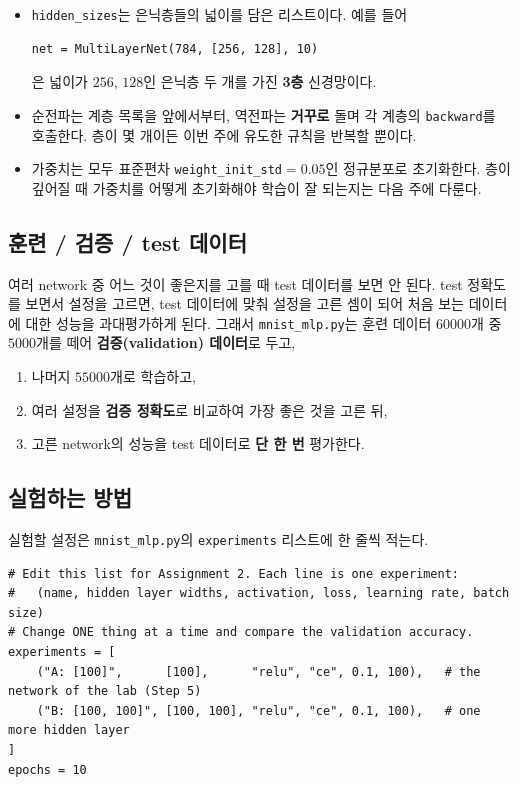 \documentclass[11pt,a4paper]{article}
\begin{document}
\begin{itemize}[leftmargin=1.8em]
\item \texttt{hidden\_sizes}는 은닉층들의 넓이를 담은 리스트이다. 예를 들어
\begin{lstlisting}
net = MultiLayerNet(784, [256, 128], 10)
\end{lstlisting}
은 넓이가 $256$, $128$인 은닉층 두 개를 가진 \textbf{3층} 신경망이다.
\item 순전파는 계층 목록을 앞에서부터, 역전파는 \textbf{거꾸로} 돌며 각 계층의 \texttt{backward}를 호출한다.
층이 몇 개이든 이번 주에 유도한 규칙을 반복할 뿐이다.
\item 가중치는 모두 표준편차 \texttt{weight\_init\_std}$=0.05$인 정규분포로 초기화한다.
층이 깊어질 때 가중치를 어떻게 초기화해야 학습이 잘 되는지는 다음 주에 다룬다.
\end{itemize}

\subsection*{훈련 / 검증 / test 데이터}

여러 network 중 어느 것이 좋은지를 고를 때 test 데이터를 보면 안 된다.
test 정확도를 보면서 설정을 고르면, test 데이터에 맞춰 설정을 고른 셈이 되어
처음 보는 데이터에 대한 성능을 과대평가하게 된다.
그래서 \texttt{mnist\_mlp.py}는 훈련 데이터 $60000$개 중 $5000$개를 떼어 \textbf{검증(validation) 데이터}로 두고,
\begin{enumerate}[leftmargin=1.8em]
\item 나머지 $55000$개로 학습하고,
\item 여러 설정을 \textbf{검증 정확도}로 비교하여 가장 좋은 것을 고른 뒤,
\item 고른 network의 성능을 test 데이터로 \textbf{단 한 번} 평가한다.
\end{enumerate}

\subsection*{실험하는 방법}

실험할 설정은 \texttt{mnist\_mlp.py}의 \texttt{experiments} 리스트에 한 줄씩 적는다.

\begin{lstlisting}
# Edit this list for Assignment 2. Each line is one experiment:
#   (name, hidden layer widths, activation, loss, learning rate, batch size)
# Change ONE thing at a time and compare the validation accuracy.
experiments = [
    ("A: [100]",      [100],      "relu", "ce", 0.1, 100),   # the network of the lab (Step 5)
    ("B: [100, 100]", [100, 100], "relu", "ce", 0.1, 100),   # one more hidden layer
]
epochs = 10
\end{lstlisting}
\end{document}
